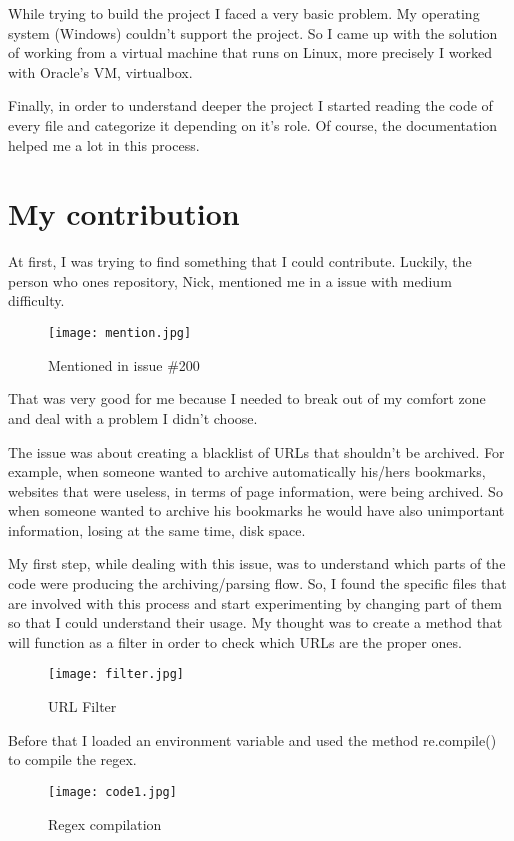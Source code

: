 \documentclass{article}
\begin{document}
While trying to build the project I faced a very basic problem. My operating system (Windows) couldn't support the project. So I came up with the solution of working from a virtual machine that runs on Linux, more precisely I worked with Oracle's VM, virtualbox. 

Finally, in order to understand deeper the project I started reading the code of every file and categorize it depending on it's role. Of course, the documentation helped me a lot in this process.


\section{My contribution}

At first, I was trying to find something that I could contribute. Luckily, the person who ones repository, Nick, mentioned me in a issue with medium difficulty.
\begin{figure}[tph!]
\centerline{\texttt{[image: mention.jpg]}}
    \caption{Mentioned in issue \#200}
    \label{fig:verticalcell}
\end{figure}
That was very good for me because I needed to break out of my comfort zone and deal with a problem I didn't choose.

The issue was about creating a blacklist of URLs that shouldn't be archived. For example, when someone wanted to archive automatically his/hers bookmarks, websites that were useless, in terms of page information, were being archived. So when someone wanted to archive his bookmarks he would have also unimportant information, losing at the same time, disk space.

My first step, while dealing with this issue, was to understand which parts of the code were producing the archiving/parsing flow. So, I found the specific files that are involved with this process and start experimenting by changing part of them so that I could understand their usage. My thought was to create a method that will function as a filter in order to check which URLs are the proper ones. 
\begin{figure}[tph!]
\centerline{\texttt{[image: filter.jpg]}}
    \caption{URL Filter}
    \label{fig:verticalcell}
\end{figure}

Before that I loaded an environment variable and used the method re.compile() to compile the regex.
\begin{figure}[tph!]
\centerline{\texttt{[image: code1.jpg]}}
    \caption{Regex compilation}
    \label{fig:verticalcell}
\end{figure}
\end{document}

